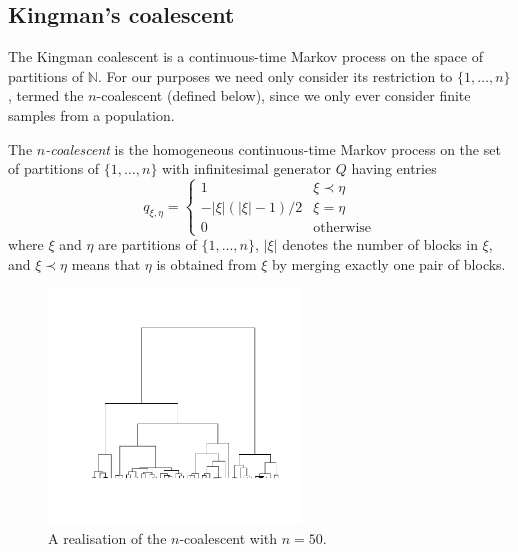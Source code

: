 \subsection{Kingman's coalescent}
The Kingman coalescent \parencite{kingman1982gene, kingman1982coal, kingman1982exch} is a continuous-time Markov process on the space of partitions of $\mathbb{N}$. For our purposes we need only consider its restriction to $\{1,\dots,n\}$, termed the $n$-coalescent (defined below), since we only ever consider finite samples from a population. 
\begin{defn}%
\label{def:kingman}
The \emph{$n$-coalescent} is the homogeneous continuous-time Markov process on the set of partitions of $\{1,\dots,n\}$ with infinitesimal generator $Q$ having entries
\begin{equation}\label{eq:KCgenerator}
q_{\xi,\eta} = \begin{cases}
1 & \xi \prec \eta\\
-|\xi|(|\xi|-1)/2 & \xi=\eta \\
0 & \text{otherwise}
\end{cases}
\end{equation}
where $\xi$ and $\eta$ are partitions of $\{1,...,n\}$, $|\xi|$ denotes the number of blocks in $\xi$, and $\xi \prec \eta$ means that $\eta$ is obtained from $\xi$ by merging exactly one pair of blocks.
\end{defn}

\begin{figure}
\centering
\includegraphics[width=0.6\textwidth, trim={2.8cm 3cm 1.5cm 2cm}, clip]{plots/ncoalescent.pdf}
\caption[The $n$-coalescent]{A realisation of the $n$-coalescent with $n=50$.}
\end{figure}

